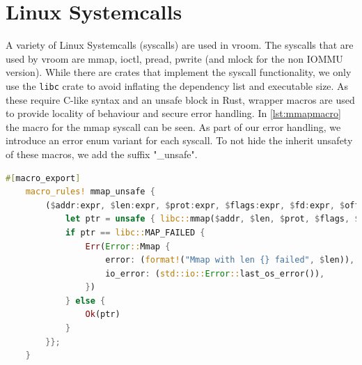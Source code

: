 \section{Linux Systemcalls}
A variety of Linux Systemcalls (syscalls) are used in vroom. The syscalls that are used by vroom are mmap, ioctl, pread, pwrite (and mlock for the non IOMMU version). While there are crates that implement the syscall functionality, we only use the \texttt{libc} crate to avoid inflating the dependency list and executable size. As these require C-like syntax and an unsafe block in Rust, wrapper macros are used to provide locality of behaviour and secure error handling. In \autoref{lst:mmapmacro} the macro for the mmap syscall can be seen.
As part of our error handling, we introduce an error enum variant for each syscall. To not hide the inherit unsafety of these macros, we add the suffix "\_unsafe".

\begin{lstlisting}[language=Rust,caption={Syscall \texttt{mmap} macro, with own error variant}, label=lst:mmapmacro]
    #[macro_export]
    macro_rules! mmap_unsafe {
        ($addr:expr, $len:expr, $prot:expr, $flags:expr, $fd:expr, $offset:expr) => {{
            let ptr = unsafe { libc::mmap($addr, $len, $prot, $flags, $fd, $offset) };
            if ptr == libc::MAP_FAILED {
                Err(Error::Mmap {
                    error: (format!("Mmap with len {} failed", $len)),
                    io_error: (std::io::Error::last_os_error()),
                })
            } else {
                Ok(ptr)
            }
        }};
    } 
\end{lstlisting}
